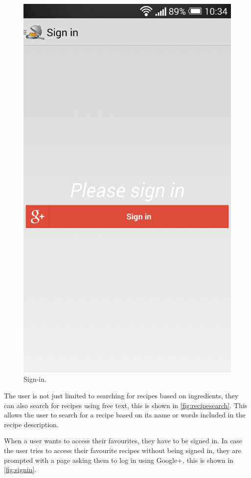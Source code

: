 \begin{figure}[H]
\begin{minipage}[t]{0.5\columnwidth}
\includegraphics[width=0.7\columnwidth]{img/screenshots/finalsignin.png}
\caption{Sign-in\label{fig:signin}.}
\end{minipage}
\end{figure}

The user is not just limited to searching for recipes based on ingredients, they can also search for recipes using free text, this is shown in \autoref{fig:recipesearch}. This allows the user to search for a recipe based on its name or words included in the recipe description.

When a user wants to access their favourites, they have to be signed in. In case the user tries to access their favourite recipes without being signed in, they are prompted with a page asking them to log in using Google+, this is shown in \autoref{fig:signin}.


